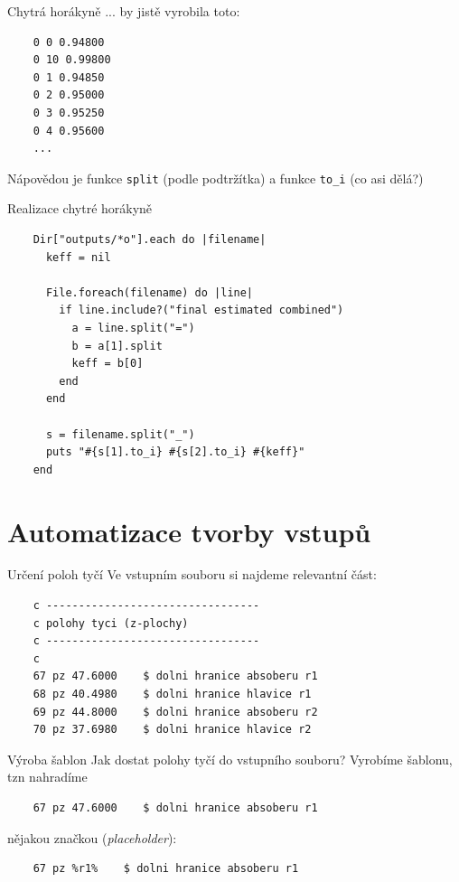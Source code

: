 \documentclass{beamer}
\begin{document}
\begin{frame}[fragile]{Chytrá horákyně}
  ... by jistě vyrobila toto:
  {\scriptsize
  \begin{verbatim}
    0 0 0.94800
    0 10 0.99800
    0 1 0.94850
    0 2 0.95000
    0 3 0.95250
    0 4 0.95600
    ...
  \end{verbatim}
  }
  Nápovědou je funkce \texttt{split} (podle podtržítka) a funkce \texttt{to\_i} (co asi dělá?)
\end{frame}

\begin{frame}[fragile]{Realizace chytré horákyně}
  \scriptsize
  \begin{verbatim}
    Dir["outputs/*o"].each do |filename|
      keff = nil

      File.foreach(filename) do |line|
        if line.include?("final estimated combined")
          a = line.split("=")
          b = a[1].split
          keff = b[0]
        end
      end

      s = filename.split("_")
      puts "#{s[1].to_i} #{s[2].to_i} #{keff}"
    end
  \end{verbatim}
\end{frame}

\section{Automatizace tvorby vstupů}

\begin{frame}[fragile]{Určení poloh tyčí}
  Ve vstupním souboru si najdeme relevantní část:
  \scriptsize
  \begin{verbatim}
    c ---------------------------------
    c polohy tyci (z-plochy)
    c ---------------------------------
    c
    67 pz 47.6000    $ dolni hranice absoberu r1
    68 pz 40.4980    $ dolni hranice hlavice r1
    69 pz 44.8000    $ dolni hranice absoberu r2
    70 pz 37.6980    $ dolni hranice hlavice r2
  \end{verbatim}
\end{frame}

\begin{frame}[fragile]{Výroba šablon}
  Jak dostat polohy tyčí do vstupního souboru? Vyrobíme šablonu, tzn nahradíme
  \begin{verbatim}
    67 pz 47.6000    $ dolni hranice absoberu r1
  \end{verbatim}
  \pause
  nějakou značkou (\emph{placeholder}):
  \begin{verbatim}
    67 pz %r1%    $ dolni hranice absoberu r1
  \end{verbatim}
\end{frame}
\end{document}
